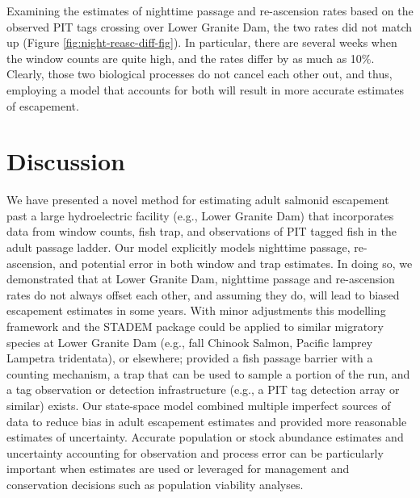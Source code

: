 \documentclass[
  12pt,
]{article}
\begin{document}
Examining the estimates of nighttime passage and re-ascension rates based on the observed PIT tags crossing over Lower Granite Dam, the two rates did not match up (Figure \ref{fig:night-reasc-diff-fig}). In particular, there are several weeks when the window counts are quite high, and the rates differ by as much as 10\%. Clearly, those two biological processes do not cancel each other out, and thus, employing a model that accounts for both will result in more accurate estimates of escapement.

\hypertarget{discussion}{%
\section{Discussion}\label{discussion}}

We have presented a novel method for estimating adult salmonid escapement past a large hydroelectric facility (e.g., Lower Granite Dam) that incorporates data from window counts, fish trap, and observations of PIT tagged fish in the adult passage ladder. Our model explicitly models nighttime passage, re-ascension, and potential error in both window and trap estimates. In doing so, we demonstrated that at Lower Granite Dam, nighttime passage and re-ascension rates do not always offset each other, and assuming they do, will lead to biased escapement estimates in some years. With minor adjustments this modelling framework and the STADEM package could be applied to similar migratory species at Lower Granite Dam (e.g., fall Chinook Salmon, Pacific lamprey Lampetra tridentata), or elsewhere; provided a fish passage barrier with a counting mechanism, a trap that can be used to sample a portion of the run, and a tag observation or detection infrastructure (e.g., a PIT tag detection array or similar) exists. Our state-space model combined multiple imperfect sources of data to reduce bias in adult escapement estimates and provided more reasonable estimates of uncertainty. Accurate population or stock abundance estimates and uncertainty accounting for observation and process error can be particularly important when estimates are used or leveraged for management and conservation decisions such as population viability analyses.
\end{document}

